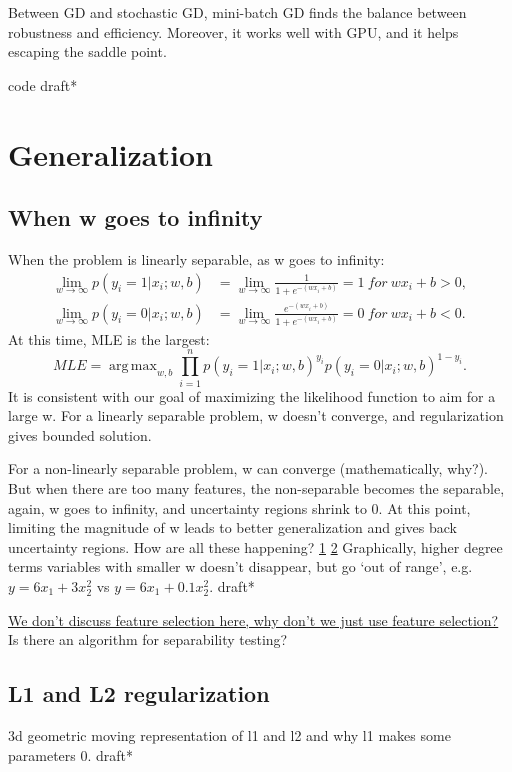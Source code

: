 \documentclass{report}
\DeclareMathOperator*{\argmax}{arg\,max}
\begin{document}
  Between GD and stochastic GD, mini-batch GD finds the balance between robustness and efficiency. Moreover, it works well with GPU, and it helps escaping the saddle point. 

  code draft*
  \chapter{Generalization}
  \section{When w goes to infinity}
  When the problem is linearly separable, as w goes to infinity:
 \begin{align*}
	\lim_{w \to \infty} p\left( y_{i}=1 | x_{i} ; w,b \right) &=  \lim_{w \to \infty} \frac{1}{1 + e^{-(wx_{i} + b)} } = 1 \ for\ wx_i + b > 0,\\
	\lim_{w \to \infty} p( y_{i}=0 | x_{i} ; w,b ) &= \lim_{w \to \infty} \frac{e^{-(wx_{i}+b)}}{1 + e^{-(wx_{i} + b)}} = 0\ for\ wx_i + b < 0 
.\end{align*}
At this time, MLE is the largest:
 \[
	 MLE = \argmax_{w, b} \prod_{i=1}^{n}  p\left( y_{i}=1 | x_{i} ; w,b \right)^{y_{i}}p\left( y_{i}=0 | x_{i} ; w,b \right)^{1 - y_{i}}  
.\] 
It is consistent with our goal of maximizing the likelihood function to aim for a large w. For a linearly separable problem, w doesn't converge, and regularization gives bounded solution.

For a non-linearly separable problem, w can converge (mathematically, why?). But when there are too many features, the non-separable becomes the separable, again, w goes to infinity, and uncertainty regions shrink to 0. At this point, limiting the magnitude of w leads to better generalization  and gives back uncertainty regions. How are all these happening? \href{https://stackoverflow.com/questions/24666312/why-limit-the-weight-size-can-prevent-overfitting-in-machine-learning}{1} \href{https://stackoverflow.com/questions/34569903/how-does-having-smaller-values-for-parameters-help-in-preventing-over-fitting}{2} Graphically, higher degree terms variables with smaller w doesn't disappear, but go `out of range', e.g. $y = 6x_1 + 3x_2^2$ vs $y = 6x_1 + 0.1x_2^2$. draft* 

\href{https://stats.stackexchange.com/q/569381/354019}{We don't discuss feature selection here, why don't we just use feature selection?} Is there an algorithm for separability testing?
\section{L1 and L2 regularization}
3d geometric moving representation of l1 and l2 and why l1 makes some parameters 0. draft*
\end{document}
